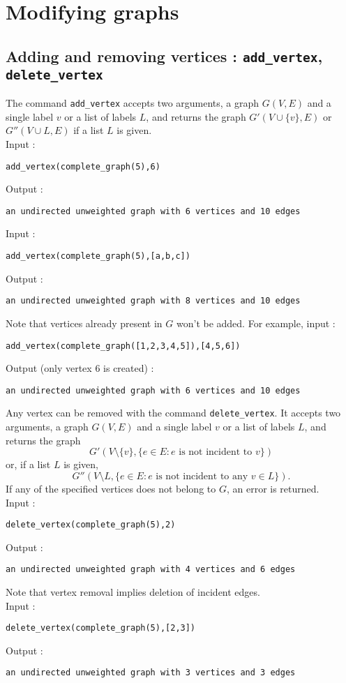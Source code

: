 \documentclass[a4paper,11pt]{article}
\begin{document}
\section{Modifying graphs}

\subsection{Adding and removing vertices : {\tt add\_vertex}, {\tt delete\_vertex}}
The command {\tt add\_vertex} accepts two arguments, a graph $ G(V,E) $ and a single label $ v $ or a list of labels $ L $, and returns the graph $ G'(V\cup\{v\},E) $ or $ G''(V\cup L,E) $ if a list $ L $ is given.\\
Input :
\begin{center}
  \tt add\_vertex(complete\_graph(5),6)
\end{center}
Output :
\begin{center}
  \tt an undirected unweighted graph with 6 vertices and 10 edges
\end{center}
Input :
\begin{center}
  \tt add\_vertex(complete\_graph(5),[a,b,c])
\end{center}
Output :
\begin{center}
  \tt an undirected unweighted graph with 8 vertices and 10 edges
\end{center}
Note that vertices already present in $ G $ won't be added. For example, input :
\begin{center}
  \tt add\_vertex(complete\_graph([1,2,3,4,5]),[4,5,6])
\end{center}
Output (only vertex 6 is created) :
\begin{center}
  \tt an undirected unweighted graph with 6 vertices and 10 edges
\end{center}

Any vertex can be removed with the command {\tt delete\_vertex}. It accepts two arguments, a graph $ G(V,E) $ and a single label $ v $ or a list of labels $ L $, and returns the graph \[ G'(V\setminus\{v\},\{e\in E:e \text{ is not incident to } v\}) \] or, if a list $ L $ is given, \[ G''(V\setminus L,\{e\in E:e \text{ is not incident to any } v\in L\}). \]
If any of the specified vertices does not belong to $ G $, an error is returned.\\
Input :
\begin{center}
  \tt delete\_vertex(complete\_graph(5),2)
\end{center}
Output :
\begin{center}
  \tt an undirected unweighted graph with 4 vertices and 6 edges
\end{center}
Note that vertex removal implies deletion of incident edges.\\
Input :
\begin{center}
  \tt delete\_vertex(complete\_graph(5),[2,3])
\end{center}
Output :
\begin{center}
  \tt an undirected unweighted graph with 3 vertices and 3 edges
\end{center}
\end{document}
